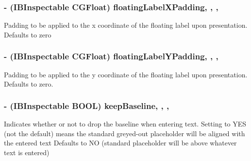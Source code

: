 \subsubsection[{floating\+Label\+X\+Padding}]{\setlength{\rightskip}{0pt plus 5cm}-\/ (I\+B\+Inspectable C\+G\+Float) floating\+Label\+X\+Padding\hspace{0.3cm}{\ttfamily [read]}, {\ttfamily [write]}, {\ttfamily [nonatomic]}, {\ttfamily [assign]}}\label{interface_j_v_float_labeled_text_field_a005ea0687f1048ae375072b0eddd842b}
Padding to be applied to the x coordinate of the floating label upon presentation. Defaults to zero \hypertarget{interface_j_v_float_labeled_text_field_a3758fd3387b355cd75a53784e55d0bfe}{}
\subsubsection[{floating\+Label\+Y\+Padding}]{\setlength{\rightskip}{0pt plus 5cm}-\/ (I\+B\+Inspectable C\+G\+Float) floating\+Label\+Y\+Padding\hspace{0.3cm}{\ttfamily [read]}, {\ttfamily [write]}, {\ttfamily [nonatomic]}, {\ttfamily [assign]}}\label{interface_j_v_float_labeled_text_field_a3758fd3387b355cd75a53784e55d0bfe}
Padding to be applied to the y coordinate of the floating label upon presentation. Defaults to zero. \hypertarget{interface_j_v_float_labeled_text_field_adbdb4e36a9903fe4fd6772c7f113570a}{}
\subsubsection[{keep\+Baseline}]{\setlength{\rightskip}{0pt plus 5cm}-\/ (I\+B\+Inspectable B\+O\+O\+L) keep\+Baseline\hspace{0.3cm}{\ttfamily [read]}, {\ttfamily [write]}, {\ttfamily [nonatomic]}, {\ttfamily [assign]}}\label{interface_j_v_float_labeled_text_field_adbdb4e36a9903fe4fd6772c7f113570a}
Indicates whether or not to drop the baseline when entering text. Setting to Y\+E\+S (not the default) means the standard greyed-\/out placeholder will be aligned with the entered text Defaults to N\+O (standard placeholder will be above whatever text is entered) \hypertarget{interface_j_v_float_labeled_text_field_a503fcd34a364088ba893cd491123ef48}{}
